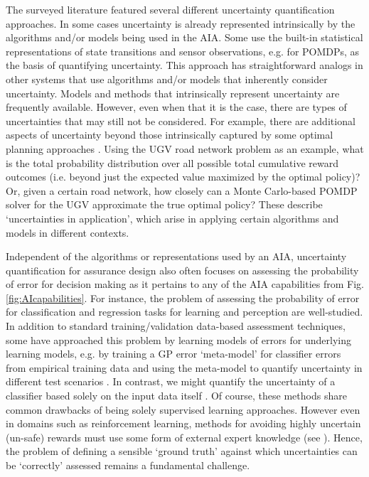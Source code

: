     The surveyed literature  featured several different uncertainty quantification approaches. In some cases uncertainty is already represented intrinsically by the algorithms and/or models being used in the AIA. Some use the built-in statistical representations of state transitions and sensor observations, e.g. for POMDPs, as the basis of quantifying uncertainty. This approach has straightforward analogs in other systems that use algorithms and/or models that inherently consider uncertainty. Models and methods that intrinsically represent uncertainty are frequently available. However, even when that it is the case, there are types of uncertainties that may still not be considered. For example, there are additional aspects of uncertainty beyond those intrinsically captured by some optimal planning approaches \cite{Aitken2016-cv,Kuter2015-qh}. 
    Using the UGV road network problem as an example, what is the total probability distribution over all possible total cumulative reward outcomes (i.e. beyond just the expected value maximized by the optimal policy)? 
    Or, given a certain road network, how closely can a Monte Carlo-based POMDP solver for the UGV approximate the true optimal policy? 
    These describe `uncertainties in application', which arise in applying certain algorithms and models in different contexts.

    Independent of the algorithms or representations used by an AIA, uncertainty quantification for assurance design also often focuses on assessing the probability of error for decision making as it pertains to any of the AIA capabilities from Fig. \ref{fig:AIcapabilities}. 
    For instance, the problem of assessing the probability of error for classification and regression tasks for learning and perception are well-studied. 
    In addition to standard training/validation data-based assessment techniques, some have approached this problem by learning models of errors for underlying learning models, e.g. by training a GP error `meta-model' for classifier errors  from empirical training data and using the meta-model to quantify uncertainty in different test scenarios \cite{Gurau2016-hs}. 
    In contrast, we might quantify the uncertainty of a classifier based solely on the input data itself \cite{Zhang2014-he}. Of course, these methods share common drawbacks of being solely supervised learning approaches. However even in domains such as reinforcement learning, methods for avoiding highly uncertain (un-safe) rewards must use some form of external expert knowledge (see \cite{Garcia2015-rs, Lipton2016-dq}). Hence, the problem of defining a sensible `ground truth' against which uncertainties can be `correctly' assessed remains a fundamental challenge. %

